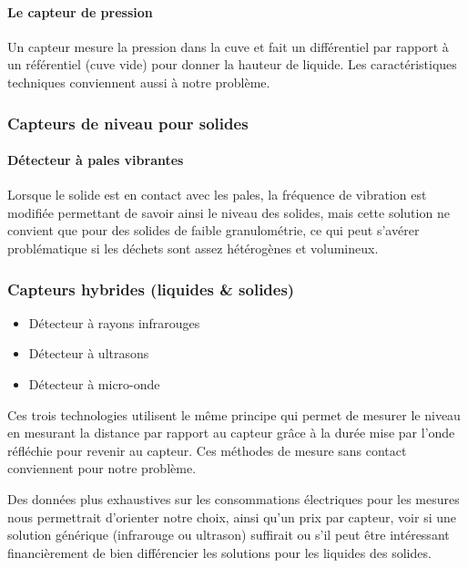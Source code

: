 \paragraph{Le capteur de pression}

Un capteur mesure la pression dans la cuve et fait un différentiel par rapport à un référentiel (cuve vide) pour donner la hauteur de liquide. Les caractéristiques techniques conviennent aussi à notre problème.

\subsubsection{Capteurs de niveau pour solides}

\paragraph{Détecteur à pales vibrantes}

Lorsque le solide est en contact avec les pales, la fréquence de vibration est modifiée permettant de savoir ainsi le niveau des solides, mais cette solution ne convient que pour des solides de faible granulométrie, ce qui peut s’avérer problématique si les déchets sont assez hétérogènes et volumineux.

\subsubsection{Capteurs hybrides (liquides \&  solides)}

\begin{itemize}
\item Détecteur à rayons infrarouges
\item Détecteur à ultrasons
\item Détecteur à micro-onde
\end{itemize}

Ces trois technologies utilisent le même principe qui permet de mesurer le niveau en mesurant la distance par rapport au capteur grâce à la durée mise par l’onde réfléchie pour revenir au capteur. Ces méthodes de mesure sans contact conviennent pour notre problème.

Des données plus exhaustives sur les consommations électriques pour les mesures nous permettrait d’orienter notre choix, ainsi qu’un prix par capteur, voir si une solution générique (infrarouge ou ultrason) suffirait ou s’il peut être intéressant financièrement de bien différencier les solutions pour les liquides des solides.

